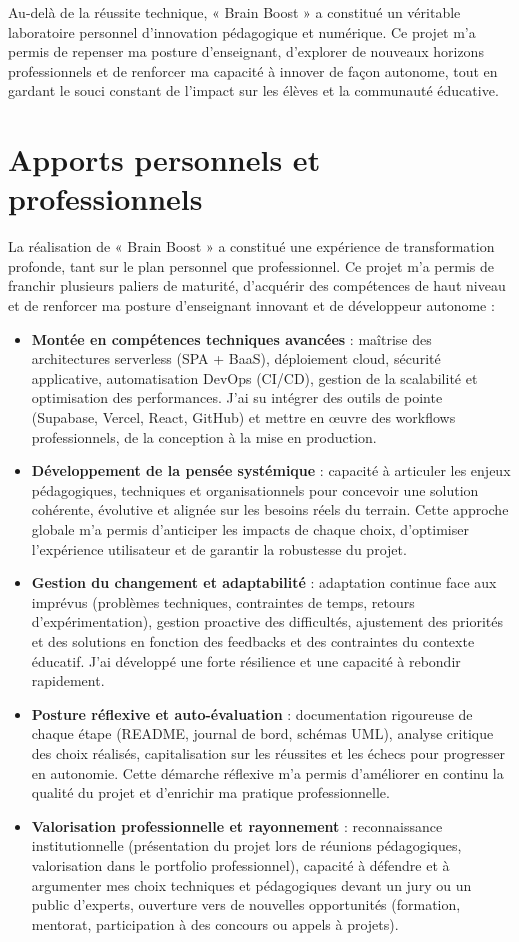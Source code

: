\documentclass[a4paper,11pt]{report}
\begin{document}
Au-delà de la réussite technique, « Brain Boost » a constitué un véritable laboratoire personnel d'innovation pédagogique et numérique. Ce projet m'a permis de repenser ma posture d'enseignant, d'explorer de nouveaux horizons professionnels et de renforcer ma capacité à innover de façon autonome, tout en gardant le souci constant de l'impact sur les élèves et la communauté éducative.

\section{Apports personnels et professionnels}
La réalisation de « Brain Boost » a constitué une expérience de transformation profonde, tant sur le plan personnel que professionnel. Ce projet m'a permis de franchir plusieurs paliers de maturité, d'acquérir des compétences de haut niveau et de renforcer ma posture d'enseignant innovant et de développeur autonome :
\begin{itemize}
    \item \textbf{Montée en compétences techniques avancées} : maîtrise des architectures serverless (SPA + BaaS), déploiement cloud, sécurité applicative, automatisation DevOps (CI/CD), gestion de la scalabilité et optimisation des performances. J'ai su intégrer des outils de pointe (Supabase, Vercel, React, GitHub) et mettre en œuvre des workflows professionnels, de la conception à la mise en production.
    \item \textbf{Développement de la pensée systémique} : capacité à articuler les enjeux pédagogiques, techniques et organisationnels pour concevoir une solution cohérente, évolutive et alignée sur les besoins réels du terrain. Cette approche globale m'a permis d'anticiper les impacts de chaque choix, d'optimiser l'expérience utilisateur et de garantir la robustesse du projet.
    \item \textbf{Gestion du changement et adaptabilité} : adaptation continue face aux imprévus (problèmes techniques, contraintes de temps, retours d'expérimentation), gestion proactive des difficultés, ajustement des priorités et des solutions en fonction des feedbacks et des contraintes du contexte éducatif. J'ai développé une forte résilience et une capacité à rebondir rapidement.
    \item \textbf{Posture réflexive et auto-évaluation} : documentation rigoureuse de chaque étape (README, journal de bord, schémas UML), analyse critique des choix réalisés, capitalisation sur les réussites et les échecs pour progresser en autonomie. Cette démarche réflexive m'a permis d'améliorer en continu la qualité du projet et d'enrichir ma pratique professionnelle.
    \item \textbf{Valorisation professionnelle et rayonnement} : reconnaissance institutionnelle (présentation du projet lors de réunions pédagogiques, valorisation dans le portfolio professionnel), capacité à défendre et à argumenter mes choix techniques et pédagogiques devant un jury ou un public d'experts, ouverture vers de nouvelles opportunités (formation, mentorat, participation à des concours ou appels à projets).
\end{itemize}
\end{document}
